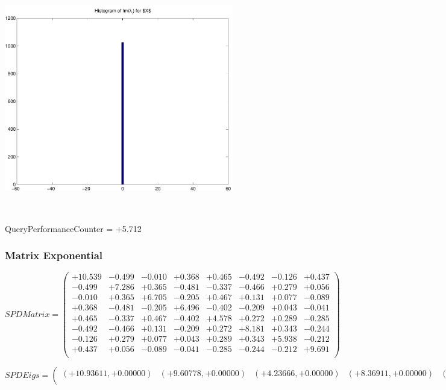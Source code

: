 \documentclass[9pt]{article}
\theoremstyle{plain}
\theoremstyle{definition}
\theoremstyle{remark}
\numberwithin{equation}{section}
\begin{document}
\includegraphics[width=10.0cm,height=10.0cm]{Im_lambda_n.pdf}

QueryPerformanceCounter  =  +5.712
\subsubsection{Matrix Exponential }
$SPD Matrix = \left(
\begin{array}{
cccccccc}
+10.539 & -0.499 & -0.010 & +0.368 & +0.465 & -0.492 & -0.126 & +0.437 \\
-0.499 & +7.286 & +0.365 & -0.481 & -0.337 & -0.466 & +0.279 & +0.056 \\
-0.010 & +0.365 & +6.705 & -0.205 & +0.467 & +0.131 & +0.077 & -0.089 \\
+0.368 & -0.481 & -0.205 & +6.496 & -0.402 & -0.209 & +0.043 & -0.041 \\
+0.465 & -0.337 & +0.467 & -0.402 & +4.578 & +0.272 & +0.289 & -0.285 \\
-0.492 & -0.466 & +0.131 & -0.209 & +0.272 & +8.181 & +0.343 & -0.244 \\
-0.126 & +0.279 & +0.077 & +0.043 & +0.289 & +0.343 & +5.938 & -0.212 \\
+0.437 & +0.056 & -0.089 & -0.041 & -0.285 & -0.244 & -0.212 & +9.691 \\
\end{array}
\right)$ \newline 

$SPD Eigs = \left(
\begin{array}{
cccccccc}
(+10.93611,+0.00000) & (+9.60778,+0.00000) & (+4.23666,+0.00000) & (+8.36911,+0.00000) & (+7.56229,+0.00000) & (+5.82791,+0.00000) & (+6.54198,+0.00000) & (+6.33139,+0.00000) \\
\end{array}
\right)$ \newline 
\end{document}
